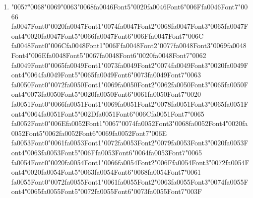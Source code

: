 \documentclass[11pt]{article}
\begin{document}
\begin{enumerate}[leftmargin=*]
  \item {\char"0057}{\char"0068}{\char"0069}{\char"0063}{\char"0068}{\csname fa0046Font5\endcsname\char"0020}{\csname fa0046Font6\endcsname\char"006F}{\csname fa0046Font7\endcsname\char"0066} {\csname fa0047Font0\endcsname\char"0020}{\csname fa0047Font1\endcsname\char"0074}{\csname fa0047Font2\endcsname\char"0068}{\csname fa0047Font3\endcsname\char"0065}{\csname fa0047Font4\endcsname\char"0020}{\csname fa0047Font5\endcsname\char"0066}{\csname fa0047Font6\endcsname\char"006F}{\csname fa0047Font7\endcsname\char"006C} {\csname fa0048Font0\endcsname\char"006C}{\csname fa0048Font1\endcsname\char"006F}{\csname fa0048Font2\endcsname\char"0077}{\csname fa0048Font3\endcsname\char"0069}{\csname fa0048Font4\endcsname\char"006E}{\csname fa0048Font5\endcsname\char"0067}{\csname fa0048Font6\endcsname\char"0020}{\csname fa0048Font7\endcsname\char"0062} {\csname fa0049Font0\endcsname\char"0065}{\csname fa0049Font1\endcsname\char"0073}{\csname fa0049Font2\endcsname\char"0074}{\csname fa0049Font3\endcsname\char"0020}{\csname fa0049Font4\endcsname\char"0064}{\csname fa0049Font5\endcsname\char"0065}{\csname fa0049Font6\endcsname\char"0073}{\csname fa0049Font7\endcsname\char"0063} {\csname fa0050Font0\endcsname\char"0072}{\csname fa0050Font1\endcsname\char"0069}{\csname fa0050Font2\endcsname\char"0062}{\csname fa0050Font3\endcsname\char"0065}{\csname fa0050Font4\endcsname\char"0073}{\csname fa0050Font5\endcsname\char"0020}{\csname fa0050Font6\endcsname\char"0061}{\csname fa0050Font7\endcsname\char"0020} {\csname fa0051Font0\endcsname\char"0066}{\csname fa0051Font1\endcsname\char"0069}{\csname fa0051Font2\endcsname\char"0078}{\csname fa0051Font3\endcsname\char"0065}{\csname fa0051Font4\endcsname\char"0064}{\csname fa0051Font5\endcsname\char"002D}{\csname fa0051Font6\endcsname\char"006C}{\csname fa0051Font7\endcsname\char"0065} {\csname fa0052Font0\endcsname\char"006E}{\csname fa0052Font1\endcsname\char"0067}{\char"0074}{\csname fa0052Font3\endcsname\char"0068}{\csname fa0052Font4\endcsname\char"0020}{\csname fa0052Font5\endcsname\char"0062}{\csname fa0052Font6\endcsname\char"0069}{\csname fa0052Font7\endcsname\char"006E} {\csname fa0053Font0\endcsname\char"0061}{\csname fa0053Font1\endcsname\char"0072}{\csname fa0053Font2\endcsname\char"0079}{\csname fa0053Font3\endcsname\char"0020}{\csname fa0053Font4\endcsname\char"0063}{\csname fa0053Font5\endcsname\char"006F}{\csname fa0053Font6\endcsname\char"0064}{\csname fa0053Font7\endcsname\char"0065} {\csname fa0054Font0\endcsname\char"0020}{\csname fa0054Font1\endcsname\char"0066}{\csname fa0054Font2\endcsname\char"006F}{\csname fa0054Font3\endcsname\char"0072}{\csname fa0054Font4\endcsname\char"0020}{\csname fa0054Font5\endcsname\char"0063}{\csname fa0054Font6\endcsname\char"0068}{\csname fa0054Font7\endcsname\char"0061} {\csname fa0055Font0\endcsname\char"0072}{\csname fa0055Font1\endcsname\char"0061}{\csname fa0055Font2\endcsname\char"0063}{\csname fa0055Font3\endcsname\char"0074}{\csname fa0055Font4\endcsname\char"0065}{\csname fa0055Font5\endcsname\char"0072}{\csname fa0055Font6\endcsname\char"0073}{\csname fa0055Font7\endcsname\char"003F}

\end{enumerate}
\end{document}
